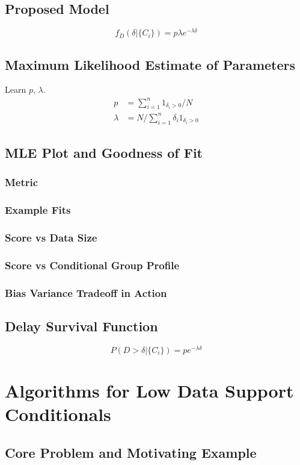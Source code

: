 \documentclass{article}
\begin{document}
\subsection{Proposed Model}
$$f_D(\delta|\{C_i\}) = p\lambda e^{-\lambda \delta}$$

\subsection{Maximum Likelihood Estimate of Parameters}
Learn $p$, $\lambda$.
\begin{align*}
    p &= \sum_{i=1}^n 1_{\delta_i > 0} / N \\
    \lambda &= N / \sum_{i=1}^n \delta_i 1_{\delta_i > 0}
\end{align*}

\subsection{MLE Plot and Goodness of Fit}
\subsubsection{Metric}
\subsubsection{Example Fits}
\subsubsection{Score vs Data Size}
\subsubsection{Score vs Conditional Group Profile}
\subsubsection{Bias Variance Tradeoff in Action}

\subsection{Delay Survival Function}
$$P(D>\delta | \{C_i\}) = p e^{-\lambda \delta}$$

\section{Algorithms for Low Data Support Conditionals}
\subsection{Core Problem and Motivating Example}
\end{document}
